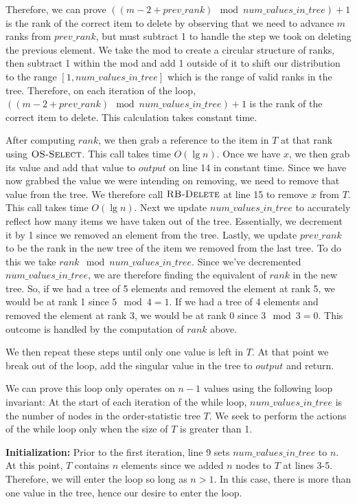\documentclass[11pt]{article}
\begin{document}
Therefore, we can prove $((m - 2 + prev\_rank) \mod num\_values\_in\_tree) + 1$ is the rank of the correct item to delete by observing that we need to advance $m$ ranks from $prev\_rank$, but must subtract 1 to handle the step we took on deleting the previous element. We take the mod to create a circular structure of ranks, then subtract 1 within the mod and add 1 outside of it to shift our distribution to the range $[1,num\_values\_in\_tree]$ which is the range of valid ranks in the tree. Therefore, on each iteration of the loop, $((m - 2 + prev\_rank) \mod num\_values\_in\_tree) + 1$ is the rank of the correct item to delete. This calculation takes constant time.

After computing $rank$, we then grab a reference to the item in $T$ at that rank using $\textnormal{\scshape OS-Select}$. This call takes time $O(\lg{n})$. Once we have $x$, we then grab its value and add that value to $output$ on line 14 in constant time. Since we have now grabbed the value we were intending on removing, we need to remove that value from the tree. We therefore call $\textnormal{\scshape RB-Delete}$ at line 15 to remove $x$ from $T$. This call takes time $O(\lg{n})$. Next we update $num\_values\_in\_tree$ to accurately reflect how many items we have taken out of the tree. Essentially, we decrement it by 1 since we removed an element from the tree. Lastly, we update $prev\_rank$ to be the rank in the new tree of the item we removed from the last tree. To do this we take $rank \mod num\_values\_in\_tree$. Since we've decremented $num\_values\_in\_tree$, we are therefore finding the equivalent of $rank$ in the new tree. So, if we had a tree of 5 elements and removed the element at rank 5, we would be at rank 1 since $5 \mod 4 = 1$. If we had a tree of 4 elements and removed the element at rank 3, we would be at rank 0 since $3 \mod 3 = 0$. This outcome is handled by the computation of $rank$ above.

We then repeat these steps until only one value is left in $T$. At that point we break out of the loop, add the singular value in the tree to $output$ and return.

We can prove this loop only operates on $n-1$ values using the following loop invariant: At the start of each iteration of the while loop, $num\_values\_in\_tree$ is the number of nodes in the order-statistic tree $T$. We seek to perform the actions of the while loop only when the size of $T$ is greater than 1.

\textbf{Initialization:} Prior to the first iteration, line 9 sets $num\_values\_in\_tree$ to $n$. At this point, $T$ contains $n$ elements since we added $n$ nodes to $T$ at lines 3-5. Therefore, we will enter the loop so long as $n > 1$. In this case, there is more than one value in the tree, hence our desire to enter the loop.
\end{document}
